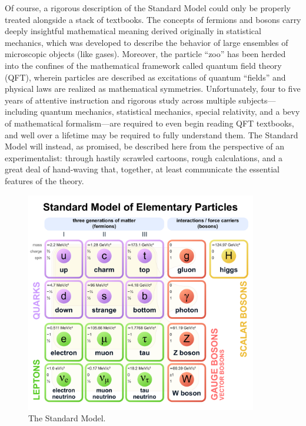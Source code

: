 Of course, a rigorous description of the Standard Model could only be properly treated alongside a stack of textbooks. 
The concepts of fermions and bosons carry deeply insightful mathematical meaning derived originally in statistical mechanics, which was developed to describe the behavior of large ensembles of microscopic objects (like gases). 
Moreover, the particle ``zoo'' has been herded into the confines of the mathematical framework called quantum field theory (QFT), wherein particles are described as excitations of quantum ``fields'' and physical laws are realized as mathematical symmetries. 
Unfortunately, four to five years of attentive instruction and rigorous study across multiple subjects---including quantum mechanics, statistical mechanics, special relativity, and a bevy of mathematical formalism---are required to even begin reading QFT textbooks, and well over a lifetime may be required to fully understand them\footnotemark{}. 
The Standard Model will instead, as promised, be described here from the perspective of an experimentalist: through hastily scrawled cartoons, rough calculations, and a great deal of hand-waving that, together, at least communicate the essential features of the theory. 

\begin{figure}[htb]
    \centering
    \includegraphics[width=0.9\textwidth]{fig/standard_model.pdf}
    \caption{
        The Standard Model.
    }
    \label{fig:standard_model}
\end{figure}

